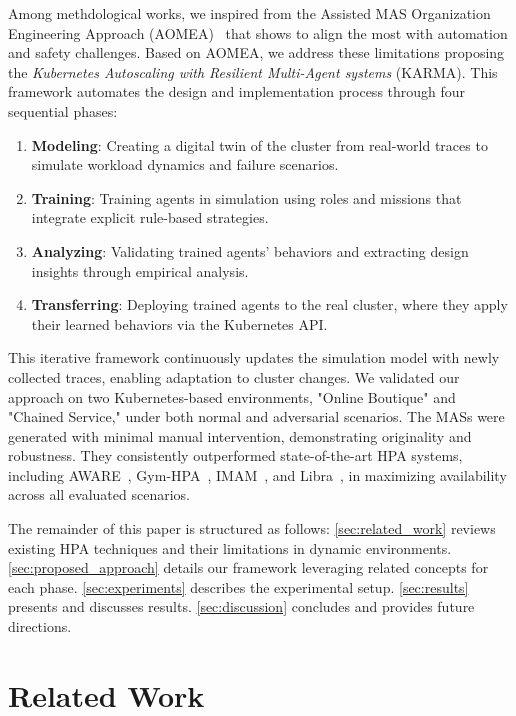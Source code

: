 \documentclass[conference]{IEEEtran}
\begin{document}
Among methdological works, we inspired from the Assisted MAS Organization Engineering Approach (AOMEA)~\cite{soule2024aomea} that shows to align the most with automation and safety challenges. Based on AOMEA, we address these limitations proposing the \textit{Kubernetes Autoscaling with Resilient Multi-Agent systems} (KARMA). This framework automates the design and implementation process through four sequential phases:
\begin{enumerate}
    \item \textbf{Modeling}: Creating a digital twin of the cluster from real-world traces to simulate workload dynamics and failure scenarios.
    \item \textbf{Training}: Training agents in simulation using roles and missions that integrate explicit rule-based strategies.
    \item \textbf{Analyzing}: Validating trained agents' behaviors and extracting design insights through empirical analysis.
    \item \textbf{Transferring}: Deploying trained agents to the real cluster, where they apply their learned behaviors via the Kubernetes API.
\end{enumerate}

This iterative framework continuously updates the simulation model with newly collected traces, enabling adaptation to cluster changes. We validated our approach on two Kubernetes-based environments, "Online Boutique" and "Chained Service," under both normal and adversarial scenarios. The MASs were generated with minimal manual intervention, demonstrating originality and robustness. They consistently outperformed state-of-the-art HPA systems, including AWARE~\cite{AWARE}, Gym-HPA~\cite{GymHPA}, IMAM~\cite{IMAM}, and Libra~\cite{Libra}, in maximizing availability across all evaluated scenarios.

The remainder of this paper is structured as follows:
\autoref{sec:related_work} reviews existing HPA techniques and their limitations in dynamic environments.
\autoref{sec:proposed_approach} details our framework leveraging related concepts for each phase.
\autoref{sec:experiments} describes the experimental setup.
\autoref{sec:results} presents and discusses results.
\autoref{sec:discussion} concludes and provides future directions.

\section{Related Work}
\label{sec:related_work}
\end{document}

